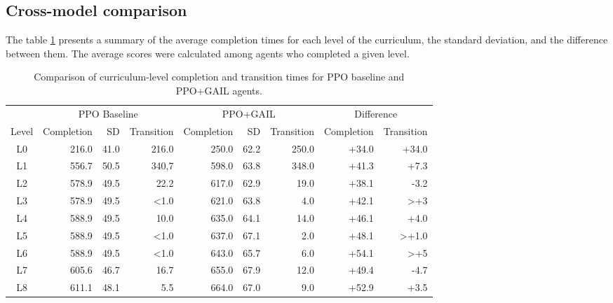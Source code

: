 \subsection{Cross-model comparison}

The table \ref{tab:cross_model_level_comparison} presents a summary of the average completion times for each level of the curriculum, the standard deviation, and the difference between them. The average scores were calculated among agents who completed a given level.
\begin{table}[H]
	\centering
	\caption{Comparison of curriculum-level completion and transition times
		for PPO baseline and PPO+GAIL agents.}
	\label{tab:cross_model_level_comparison}
	\scriptsize
	\setlength{\tabcolsep}{5pt}
	
	\begin{tabular}{c rrr rrr rr}
		\toprule
		& \multicolumn{3}{c}{PPO Baseline}
		& \multicolumn{3}{c}{PPO+GAIL}
		& \multicolumn{2}{c}{Difference} \\
		\cmidrule(lr){2-4}
		\cmidrule(lr){5-7}
		\cmidrule(lr){8-9}
		Level
		& Completion & SD & Transition
		& Completion & SD & Transition
		& Completion & Transition \\
		\midrule
		L0  & 216.0  & 41.0  & 216.0
		& 250.0  & 62.2  & 250.0
		& +34.0  & +34.0 \\
		
		L1  & 556.7  & 50.5  & 340,7
		& 598.0  & 63.8  & 348.0
		& +41.3  & +7.3 \\
		
		L2  & 578.9  & 49.5  & 22.2
		& 617.0  & 62.9  & 19.0
		& +38.1  & -3.2 \\
		
		L3  & 578.9  & 49.5  & <1.0
		& 621.0  & 63.8  & 4.0
		& +42.1  & >+3 \\
		
		L4  & 588.9  & 49.5  & 10.0
		& 635.0  & 64.1  & 14.0
		& +46.1  & +4.0 \\
		
		L5  & 588.9  & 49.5  & <1.0
		& 637.0  & 67.1  & 2.0
		& +48.1  & >+1.0 \\
		
		L6  & 588.9  & 49.5  & <1.0
		& 643.0  & 65.7  & 6.0
		& +54.1  & >+5 \\
		
		L7  & 605.6  & 46.7  &  16.7
		& 655.0  & 67.9  & 12.0
		& +49.4  & -4.7 \\
		
		L8  & 611.1  & 48.1  & 5.5
		& 664.0  & 67.0  & 9.0
		& +52.9  & +3.5 \\
		

\end{tabular}
\end{table}
